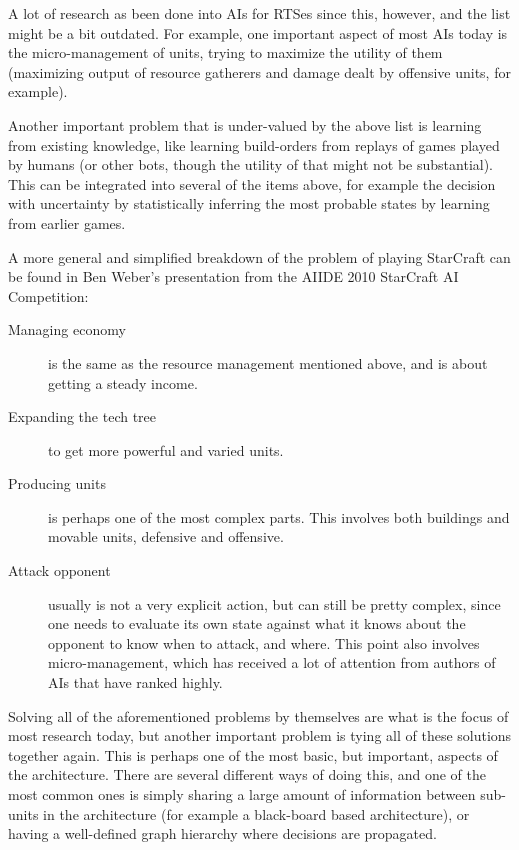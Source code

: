A lot of research as been done into AIs for RTSes since this, however, and the
list might be a bit outdated. For example, one important aspect of most AIs
today is the micro-management of units, trying to maximize the utility of them 
(maximizing output of resource gatherers and damage dealt by offensive units,
for example).

Another important problem that is under-valued by the above list is learning
from existing knowledge, like learning build-orders from replays of games played
by humans (or other bots, though the utility of that might not be substantial).
This can be integrated into several of the items above, for example the decision
with uncertainty by statistically inferring the most probable states by
learning from earlier games.

A more general and simplified breakdown of the problem of playing StarCraft can
be found in Ben Weber's presentation from the AIIDE 2010 StarCraft AI
Competition:\cite{weber2010aiide}

\begin{description}
  \item [Managing economy] is the same as the resource management mentioned
    above, and is about getting a steady income.
  \item [Expanding the tech tree] to get more powerful and varied units.
  \item [Producing units] is perhaps one of the most complex parts. This
    involves both buildings and movable units, defensive and offensive.
  \item [Attack opponent] usually is not a very explicit action, but can still
    be pretty complex, since one needs to evaluate its own state against what
    it knows about the opponent to know when to attack, and where. This point
    also involves micro-management, which has received a lot of attention from 
    authors of AIs that have ranked highly.
\end{description}

Solving all of the aforementioned problems by themselves are what is the focus
of most research today, but another important problem is tying all of these
solutions together again. This is perhaps one of the most basic, but important,
aspects of the architecture. There are several different ways of doing this, and
one of the most common ones is simply sharing a large amount of information
between sub-units in the architecture (for example a black-board based
architecture), or having a well-defined graph hierarchy where decisions are
propagated.

